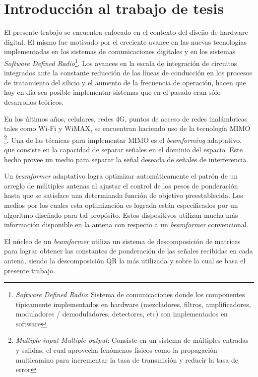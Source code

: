 \chapter{Introducción al trabajo de tesis}

El presente trabajo se encuentra enfocado en el contexto del diseño de hardware digital. El mismo fue motivado por el creciente avance en las nuevas tecnologías implementadas en los sistemas de comunicaciones digitales y en los sistemas \textit{Software Defined Radio}\footnote{\label{SDR}\textit{Software Defined Radio}: Sistema de comunicaciones donde los componentes típicamente implementados en hardware (mezcladores, filtros, amplificadores, moduladores / demoduladores, detectores, etc) son implementados en software}. Los avances en la escala de integración de circuitos integrados ante la constante reducción de las líneas de conducción en los procesos de tratamiento del silicio y el aumento de la frecuencia de operación, hacen que hoy en día sea posible implementar sistemas que en el pasado eran sólo desarrollos teóricos.

En los últimos años, celulares, redes 4G, puntos de acceso de redes inalámbricas tales como Wi-Fi y WiMAX, se encuentran haciendo uso de la tecnología MIMO \footnote{\label{MIMO}\textit{Multiple-input Multiple-output}: Consiste en un sistema de múltiples entradas y salidas, el cual aprovecha fenómenos físicos como la propagación multicamino para incrementar la tasa de transmisión y reducir la tasa de error}. Una de las técnicas para implementar MIMO es el \textit{beamforming} adaptativo, que consiste en la capacidad de separar señales en el dominio del espacio. Este hecho provee un medio para separar la señal deseada de señales de interferencia.

Un \textit{beamformer} adaptativo logra optimizar automáticamente el patrón de un arreglo de múltiples antenas al ajustar el control de los pesos de ponderación hasta que se satisface una determinada función de objetivo preestablecida. Los medios por los cuales esta optimización es lograda están especificados por un algoritmo diseñado para tal propósito. Estos dispositivos utilizan mucha más información disponible en la antena con respecto a un \textit{beamformer} convencional.

El núcleo de un \textit{beamformer} utiliza un sistema de descomposición de matrices para lograr obtener las constantes de ponderación de las señales recibidas en cada antena, siendo la descomposición QR la más utilizada y sobre la cual se basa el presente trabajo.

